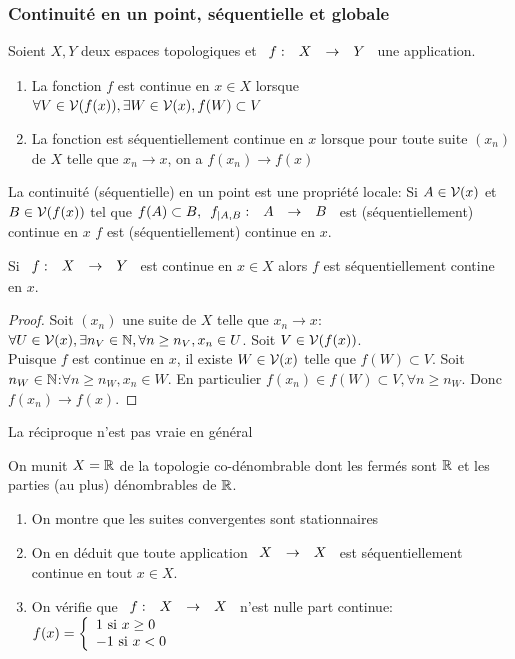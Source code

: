 \documentclass[]{report}
\begin{document}
    \subsubsection*{Continuité en un point, séquentielle et globale}

    \begin{df}{}{}
        Soient $X,Y$ deux espaces topologiques et $\begin{array}{ccccc} f : & X & \to & Y \end{array}$ une application.
        \begin{enumerate}
            \item La fonction $f$ est continue en $x\in X$ lorsque $\forall V\in\mathcal{V}(f(x)),\exists W\in \mathcal{V}(x),f(W)\subset V$
            \item La fonction est séquentiellement continue en $x$ lorsque pour toute suite $(x_n)$ de $X$ telle que $x_n\to x$, on a $f(x_n)\to f(x)$
        \end{enumerate}
    \end{df}

    \begin{re}{}{}
        La continuité (séquentielle) en un point est une propriété locale: Si $A\in\mathcal{V}(x)$ et $B\in\mathcal{V}(f(x))$ tel que $f(A)\subset B,\begin{array}{ccccc} f_{|A,B} : & A & \to & B \end{array}$ est (séquentiellement) continue en $x$ \ssi $f$ est (séquentiellement) continue en $x$.
    \end{re}

    \begin{tm}{}{}
        Si $\begin{array}{ccccc} f : & X & \to & Y \end{array}$ est continue en $x\in X$ alors $f$ est séquentiellement contine en $x$.
    \end{tm}

    \begin{proof}{}{}
        Soit $(x_n)$ une suite de $X$ telle que $x_n\to x$:$\forall U\in \mathcal{V}(x),\exists n_V\in\mathbb{N},\forall n\ge n_V,x_n\in U$. Soit $V\in\mathcal{V} (f(x))$.\\
        Puisque $f$  est continue en $x$, il existe $W\in\mathcal{V}(x)$ telle que $f(W)\subset V$. Soit $n_W\in\mathbb{N}$:$\forall n\ge n_W,x_n\in W$. En particulier $f(x_n)\in f(W)\subset V,\forall n\ge n_W$. Donc $f(x_n)\to f(x)$.
    \end{proof}

    \begin{re}{}{}
        La réciproque n'est pas vraie en général
    \end{re}

    \begin{ex}{}{}
        On munit $X=\mathbb{R}$ de la topologie co-dénombrable dont les fermés sont $\mathbb{R}$ et les parties (au plus) dénombrables de $\mathbb{R}$.
        \begin{enumerate}
            \item On montre que les suites convergentes sont stationnaires
            \item On en déduit que toute application $\begin{array}{ccccc} X & \to & X \end{array}$ est séquentiellement continue en tout $x\in X$.
            \item On vérifie que $\begin{array}{ccccc} f : & X & \to & X \end{array}$ n'est nulle part continue: $f(x)=\left\{\begin{array}{ll} 1\text{ si }x\ge 0\\ -1\text{ si }x<0 \end{array} \right.$
        \end{enumerate}
    \end{ex}
\end{document}
